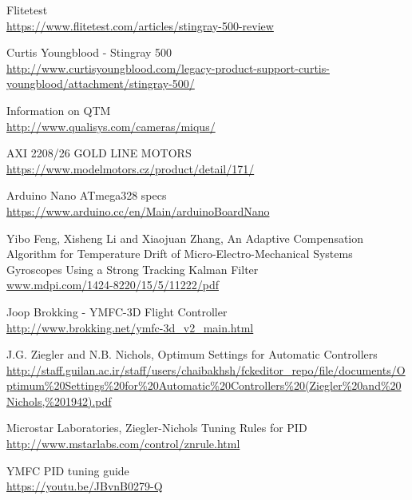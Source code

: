 \begin{thebibliography}{9}
 Flitetest \\
    \url{https://www.flitetest.com/articles/stingray-500-review}
    
 Curtis Youngblood - Stingray 500 \\
    \url{http://www.curtisyoungblood.com/legacy-product-support-curtis-youngblood/attachment/stingray-500/}


             Information on QTM \\ 
\url{http://www.qualisys.com/cameras/miqus/}

             AXI 2208/26 GOLD LINE MOTORS \\ 
\url{https://www.modelmotors.cz/product/detail/171/}

             Arduino Nano ATmega328 specs \\ 
\url{https://www.arduino.cc/en/Main/arduinoBoardNano}

Yibo Feng, Xisheng Li and Xiaojuan Zhang, An Adaptive Compensation Algorithm for Temperature Drift of Micro-Electro-Mechanical Systems Gyroscopes Using a Strong Tracking Kalman Filter \\
\url{www.mdpi.com/1424-8220/15/5/11222/pdf}

Joop Brokking - YMFC-3D Flight Controller \\
\url{http://www.brokking.net/ymfc-3d_v2_main.html}


             J.G. Ziegler and N.B. Nichols, Optimum Settings for Automatic Controllers \\ 
\url{http://staff.guilan.ac.ir/staff/users/chaibakhsh/fckeditor_repo/file/documents/Optimum\%20Settings\%20for\%20Automatic\%20Controllers\%20(Ziegler\%20and\%20Nichols,\%201942).pdf}

             Microstar Laboratories, Ziegler-Nichols Tuning Rules for PID \\ 
\url{http://www.mstarlabs.com/control/znrule.html}

             YMFC PID tuning guide \\ 
\url{https://youtu.be/JBvnB0279-Q}


\end{thebibliography}




